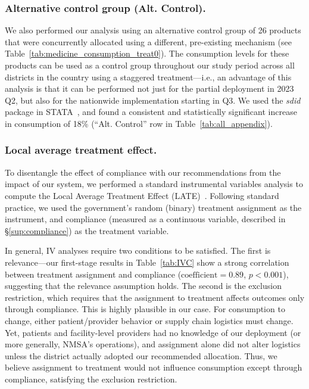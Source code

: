 \documentclass[12pt]{article}
\begin{document}
\subsubsection{Alternative control group (Alt. Control).}
We also performed our analysis using an alternative control group of 26 products that were concurrently allocated using a different, pre-existing mechanism (see Table~\ref{tab:medicine_consumption_treat0}). The consumption levels for these products can be used as a control group throughout our study period across all districts in the country using a staggered treatment---i.e., an advantage of this analysis is that it can be performed not just for the partial deployment in 2023 Q2, but also for the nationwide implementation starting in Q3. We used the \textit{sdid} package in STATA~\cite{clarke2023synthetic}, and found a consistent and statistically significant increase in consumption of 18\% (``Alt. Control'' row in Table~\ref{tab:all_appendix}).

\subsubsection{Local average treatment effect.} \label{ssec:LATE}

To disentangle the effect of compliance with our recommendations from the impact of our system, we performed a standard instrumental variables analysis to compute the Local Average Treatment Effect (LATE)~\cite{angrist1995identification}. Following standard practice, we used the government's random (binary) treatment assignment as the instrument, and compliance (measured as a continuous variable, described in \S\ref{sup:compliance}) as the treatment variable.

In general, IV analyses require two conditions to be satisfied. The first is relevance---our first-stage results in Table~\ref{tab:IVC} show a strong correlation between treatment assignment and compliance ($\text{coefficient} = 0.89$, $p < 0.001$), suggesting that the relevance assumption holds. The second is the exclusion restriction, which requires that the assignment to treatment affects outcomes only through compliance. This is highly plausible in our case. For consumption to change, either patient/provider behavior or supply chain logistics must change. Yet, patients and facility-level providers had no knowledge of our deployment (or more generally, NMSA's operations), and assignment alone did not alter logistics unless the district actually adopted our recommended allocation. Thus, we believe assignment to treatment would not influence consumption except through compliance, satisfying the exclusion restriction.
\end{document}
